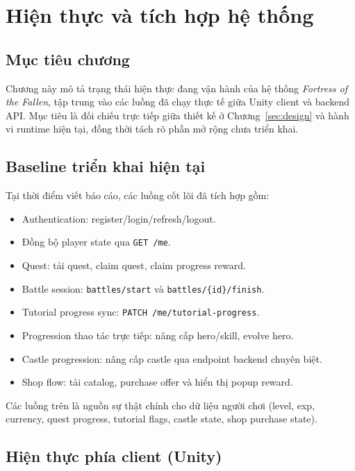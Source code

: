 \section{Hiện thực và tích hợp hệ thống}
\label{sec:implementation}

\subsection{Mục tiêu chương}
\label{subsec:impl-goals}

Chương này mô tả trạng thái hiện thực đang vận hành của hệ thống \textit{Fortress of the Fallen}, tập trung vào các luồng đã chạy thực tế giữa Unity client và backend API. Mục tiêu là đối chiếu trực tiếp giữa thiết kế ở Chương~\ref{sec:design} và hành vi runtime hiện tại, đồng thời tách rõ phần mở rộng chưa triển khai.

\subsection{Baseline triển khai hiện tại}
\label{subsec:impl-baseline}

Tại thời điểm viết báo cáo, các luồng cốt lõi đã tích hợp gồm:
\begin{itemize}
    \item Authentication: register/\allowbreak login/\allowbreak refresh/\allowbreak logout.
    \item Đồng bộ player state qua \texttt{GET /me}.
    \item Quest: tải quest, claim quest, claim progress reward.
    \item Battle session: \texttt{battles/start} và \texttt{battles/\{id\}/finish}.
    \item Tutorial progress sync: \texttt{PATCH /me/tutorial-progress}.
    \item Progression thao tác trực tiếp: nâng cấp hero/\allowbreak skill, evolve hero.
    \item Castle progression: nâng cấp castle qua endpoint backend chuyên biệt.
    \item Shop flow: tải catalog, purchase offer và hiển thị popup reward.
\end{itemize}

Các luồng trên là nguồn sự thật chính cho dữ liệu người chơi (level, exp, currency, quest progress, tutorial flags, castle state, shop purchase state).

\subsection{Hiện thực phía client (Unity)}
\label{subsec:impl-client}

